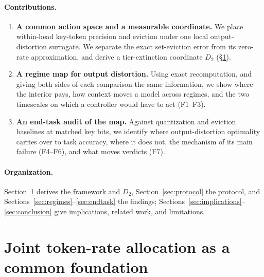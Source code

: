 \documentclass{article}
\theoremstyle{definition}
\begin{document}
\paragraph{Contributions.}
\begin{enumerate}[leftmargin=*,itemsep=1pt,topsep=2pt]
  \item \textbf{A common action space and a measurable coordinate.} We place within-head key-token precision and eviction under one local output-distortion surrogate.  We separate the exact set-eviction error from its zero-rate approximation, and derive a tier-extinction coordinate $D_2$ (\S\ref{sec:framework}).
  \item \textbf{A regime map for output distortion.} Using exact recomputation, and giving both sides of each comparison the same information, we show where the interior pays, how context moves a model across regimes, and the two timescales on which a controller would have to act (F1--F3).
  \item \textbf{An end-task audit of the map.} Against quantization and eviction baselines at matched key bits, we identify where output-distortion optimality carries over to task accuracy, where it does not, the mechanism of its main failure (F4--F6), and what moves verdicts (F7).
\end{enumerate}


\paragraph{Organization.}  Section~\ref{sec:framework} derives the framework and $D_2$, Section~\ref{sec:protocol} the protocol, and Sections~\ref{sec:regimes}--\ref{sec:endtask} the findings; Sections~\ref{sec:implications}--\ref{sec:conclusion} give implications, related work, and limitations.

\section{Joint token-rate allocation as a common foundation}
\label{sec:framework}
\end{document}
